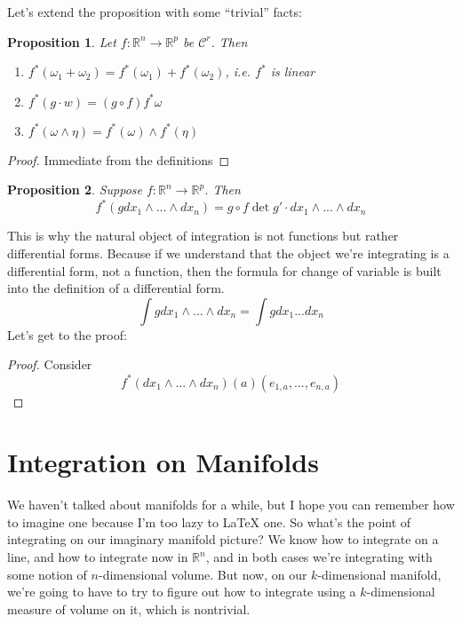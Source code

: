 \documentclass{article}
\newtheorem{proposition}{Proposition}
\newcommand{\reals}[0]{\mathbb{R}}
\newcommand{\mc}[1]{\mathcal{#1}}
\begin{document}
Let's extend the proposition with some ``trivial'' facts:
\begin{proposition}
  Let \(f: \reals^n \to \reals^p\) be \(\mc{C}^r\). Then
  \begin{enumerate}

    \item \(f^*(\omega_1 + \omega_2) = f^*(\omega_1) + f^*(\omega_2)\), i.e. \(f^*\) is linear

    \item \(f^*(g \cdot w) = (g \circ f)f^*\omega\)

    \item \(f^*(\omega \wedge \eta) = f^*(\omega) \wedge f^*(\eta)\)

  \end{enumerate}
\end{proposition}
\begin{proof}
  Immediate from the definitions
\end{proof}
\begin{proposition}
  Suppose \(f: \reals^n \to \reals^p\). Then
  \begin{equation}
    f^*(gdx_1 \wedge ... \wedge dx_n) = g \circ f\det g' \cdot dx_1 \wedge ... \wedge dx_n
  \end{equation}
\end{proposition}
This is why the natural object of integration is not functions but rather differential forms. Because if we understand that the object we're integrating is a differential form, not a function, then the formula for change of variable is built into the definition of a differential form.
\begin{equation}
  \int gdx_1 \wedge ... \wedge dx_n = \int gdx_1...dx_n
\end{equation}
Let's get to the proof:
\begin{proof}
  Consider
  \begin{equation}
    f^*(dx_1 \wedge ... \wedge dx_n)(a)(e_{1,a},...,e_{n,a})
  \end{equation}
\end{proof}

\section{Integration on Manifolds}

We haven't talked about manifolds for a while, but I hope you can remember how to imagine one because I'm too lazy to {\LaTeX} one. So what's the point of integrating on our imaginary manifold picture? We know how to integrate on a line, and how to integrate now in \(\reals^n\), and in both cases we're integrating with some notion of \(n\)-dimensional volume. But now, on our \(k\)-dimensional manifold, we're going to have to try to figure out how to integrate using a \(k\)-dimensional measure of volume on it, which is nontrivial.
\end{document}
